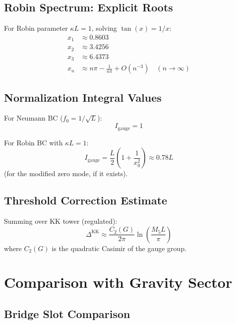 \documentclass[11pt,a4paper]{article}
\begin{document}
\subsection{Robin Spectrum: Explicit Roots}

For Robin parameter $\kappa L = 1$, solving $\tan(x) = 1/x$:
\begin{align}
  x_1 &\approx 0.8603
  \label{eq:x1-robin} \\
  x_2 &\approx 3.4256
  \label{eq:x2-robin} \\
  x_3 &\approx 6.4373
  \label{eq:x3-robin} \\
  x_n &\approx n\pi - \frac{1}{n\pi} + O(n^{-3}) \quad (n \to \infty)
  \label{eq:xn-asymptotic}
\end{align}

\subsection{Normalization Integral Values}

For Neumann BC ($f_0 = 1/\sqrt{L}$):
\begin{equation}
  I_{\text{gauge}} = 1
  \label{eq:I-neumann}
\end{equation}

For Robin BC with $\kappa L = 1$:
\begin{equation}
  I_{\text{gauge}} = \frac{L}{2}\left(1 + \frac{1}{x_0^2}\right) \approx 0.78 L
  \label{eq:I-robin}
\end{equation}
(for the modified zero mode, if it exists).

\subsection{Threshold Correction Estimate}

Summing over KK tower (regulated):
\begin{equation}
  \Delta^{\text{KK}} \approx \frac{C_2(G)}{2\pi} \ln\left(\frac{M_5 L}{\pi}\right)
  \label{eq:threshold-estimate}
\end{equation}
where $C_2(G)$ is the quadratic Casimir of the gauge group.

\section{Comparison with Gravity Sector}
\label{app:comparison}

\subsection{Bridge Slot Comparison}
\end{document}
